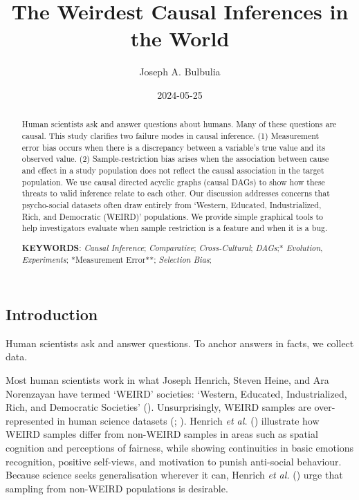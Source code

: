 \documentclass[
  single column]{article}
\title{The Weirdest Causal Inferences in the World}
\author{Joseph A. Bulbulia}
\affil{%
             \small{     Victoria University of Wellington, New Zealand
          ORCID \textcolor[HTML]{A6CE39}{\aiOrcid} ~0000-0002-5861-2056 }
              }
\date{2024-05-25}
\begin{document}
\maketitle
\begin{abstract}
Human scientists ask and answer questions about humans. Many of these
questions are causal. This study clarifies two failure modes in causal
inference. (1) Measurement error bias occurs when there is a discrepancy
between a variable's true value and its observed value. (2)
Sample-restriction bias arises when the association between cause and
effect in a study population does not reflect the causal association in
the target population. We use causal directed acyclic graphs (causal
DAGs) to show how these threats to valid inference relate to each other.
Our discussion addresses concerns that psycho-social datasets often draw
entirely from `Western, Educated, Industrialized, Rich, and Democratic
(WEIRD)' populations. We provide simple graphical tools to help
investigators evaluate when sample restriction is a feature and when it
is a bug.

\textbf{KEYWORDS}: \emph{Causal Inference}; \emph{Comparative};
\emph{Cross-Cultural}; \emph{DAGs};* \emph{Evolution},
\emph{Experiments}; *Measurement Error**; \emph{Selection Bias};
\end{abstract}

\subsection{Introduction}\label{introduction}

Human scientists ask and answer questions. To anchor answers in facts,
we collect data.

Most human scientists work in what Joseph Henrich, Steven Heine, and Ara
Norenzayan have termed `WEIRD' societies: `Western, Educated,
Industrialized, Rich, and Democratic Societies'
().
Unsurprisingly, WEIRD samples are over-represented in human science
datasets (;
). Henrich \emph{et al.}
() illustrate how WEIRD samples
differ from non-WEIRD samples in areas such as spatial cognition and
perceptions of fairness, while showing continuities in basic emotions
recognition, positive self-views, and motivation to punish anti-social
behaviour. Because science seeks generalisation wherever it can, Henrich
\emph{et al.} () urge that
sampling from non-WEIRD populations is desirable.
\end{document}
